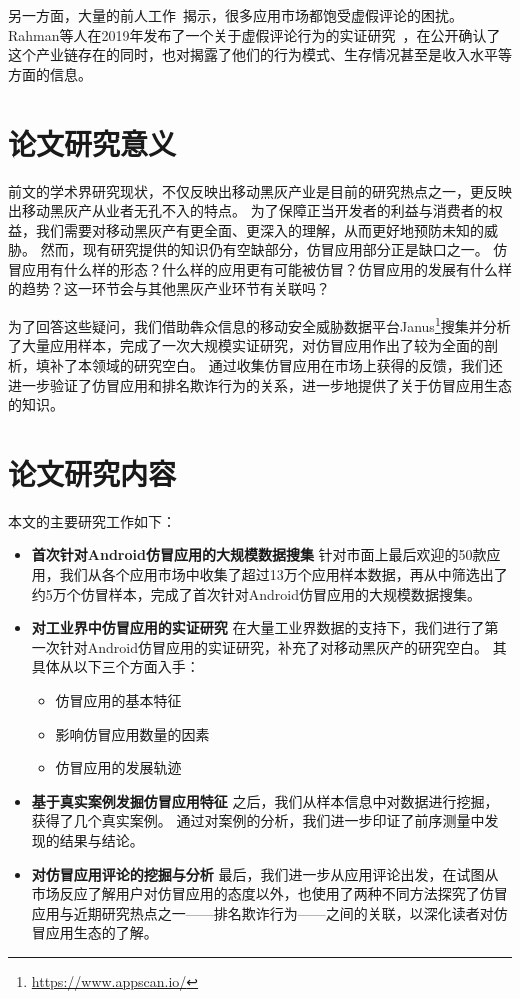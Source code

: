 另一方面，大量的前人工作~\cite{hernandez2019the, xie2014grouptie, zhu2014discovery, hu2019want, chen2017toward, xie2016you, hooi2016fraudar}揭示，很多应用市场都饱受虚假评论的困扰。
Rahman等人在2019年发布了一个关于虚假评论行为的实证研究~\cite{rahman2019art}，在公开确认了这个产业链存在的同时，也对揭露了他们的行为模式、生存情况甚至是收入水平等方面的信息。


\section{论文研究意义}

前文的学术界研究现状，不仅反映出移动黑灰产业是目前的研究热点之一，更反映出移动黑灰产从业者无孔不入的特点。
为了保障正当开发者的利益与消费者的权益，我们需要对移动黑灰产有更全面、更深入的理解，从而更好地预防未知的威胁。
然而，现有研究提供的知识仍有空缺部分，仿冒应用部分正是缺口之一。
仿冒应用有什么样的形态？什么样的应用更有可能被仿冒？仿冒应用的发展有什么样的趋势？这一环节会与其他黑灰产业环节有关联吗？

为了回答这些疑问，我们借助犇众信息的移动安全威胁数据平台Janus\footnote{\url{https://www.appscan.io/}}搜集并分析了大量应用样本，完成了一次大规模实证研究，对仿冒应用作出了较为全面的剖析，填补了本领域的研究空白。
通过收集仿冒应用在市场上获得的反馈，我们还进一步验证了仿冒应用和排名欺诈行为的关系，进一步地提供了关于仿冒应用生态的知识。


\section{论文研究内容}
本文的主要研究工作如下：
\begin{itemize}
	\setlength{\itemsep}{1pt}
	\setlength{\parskip}{0pt}
	\setlength{\parsep}{0pt}

	\item{\bf 首次针对Android仿冒应用的大规模数据搜集}
	针对市面上最后欢迎的50款应用，我们从各个应用市场中收集了超过13万个应用样本数据，再从中筛选出了约5万个仿冒样本，完成了首次针对Android仿冒应用的大规模数据搜集。

	\item{\bf 对工业界中仿冒应用的实证研究}
	在大量工业界数据的支持下，我们进行了第一次针对Android仿冒应用的实证研究，补充了对移动黑灰产的研究空白。
	其具体从以下三个方面入手：
	\begin{itemize}
		\item 仿冒应用的基本特征
		\item 影响仿冒应用数量的因素
		\item 仿冒应用的发展轨迹
	\end{itemize}

	\item {\bf 基于真实案例发掘仿冒应用特征}
	之后，我们从样本信息中对数据进行挖掘，获得了几个真实案例。
	通过对案例的分析，我们进一步印证了前序测量中发现的结果与结论。

	\item {\bf 对仿冒应用评论的挖掘与分析}
	最后，我们进一步从应用评论出发，在试图从市场反应了解用户对仿冒应用的态度以外，也使用了两种不同方法探究了仿冒应用与近期研究热点之一——排名欺诈行为——之间的关联，以深化读者对仿冒应用生态的了解。

\end{itemize}


